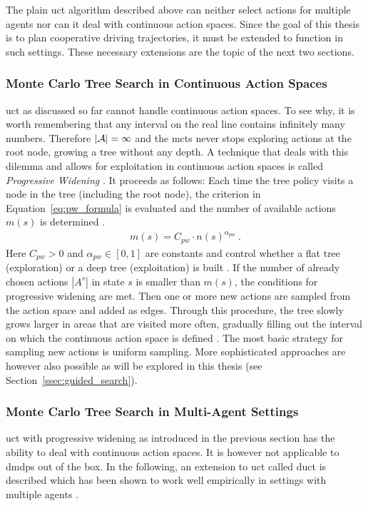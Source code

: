 The plain \gls{uct} algorithm described above can neither select actions for multiple agents nor can it deal with continuous action spaces. Since the goal of this thesis is to plan cooperative driving trajectories, it must be extended to function in such settings. These necessary extensions are the topic of the next two sections.

\subsubsection{Monte Carlo Tree Search in Continuous Action Spaces}\label{sssec:progressive_widening}
\gls{uct} as discussed so far cannot handle continuous action spaces. To see why, it is worth remembering that any interval on the real line contains infinitely many numbers. Therefore $|\actionspace| = \infty$ and the \gls{mcts} never stops exploring actions at the root node, growing a tree without any depth. A technique that deals with this dilemma and allows for exploitation in continuous action spaces is called \emph{Progressive Widening} \cite{couetouxContinuousUpperConfidence2011}. It proceeds as follows: Each time the tree policy visits a node in the tree (including the root node), the criterion in Equation~\ref{eq:pw_formula} is evaluated and the number of available actions $m(s)$ is determined \cite{moerlandA0CAlphaZero2018}.
\begin{gather}\label{eq:pw_formula}
    m(s) = C_{pw} \cdot n(s)^{\alpha_{pw}}~.
\end{gather}
Here $C_{pw} > 0$ and $\alpha_{pw} \in [0, 1]$  are constants and control whether a flat tree (exploration) or a deep tree (exploitation) is built \cite{couetouxContinuousUpperConfidence2011}. If the number of already chosen actions $|A^s|$ in state $s$ is smaller than $m(s)$, the conditions for progressive widening are met. Then one or more new actions are sampled from the action space and added as edges. Through this procedure, the tree slowly grows larger in areas that are visited more often, gradually filling out the interval on which the continuous action space is defined \cite{couetouxContinuousUpperConfidence2011}. The most basic strategy for sampling new actions is uniform sampling. More sophisticated approaches are however also possible as will be explored in this thesis (see Section~\ref{ssec:guided_search}).

\subsubsection{Monte Carlo Tree Search in Multi-Agent Settings}\label{sssec:decoupled_uct}
\gls{uct} with progressive widening as introduced in the previous section has the ability to deal with continuous action spaces. It is however not applicable to \glspl{dmdp} out of the box. In the following, an extension to \gls{uct} called \gls{duct} is described which has been shown to work well empirically in settings with multiple agents \cite{takMonteCarloTree2014, lanctotMonteCarloTree}.

